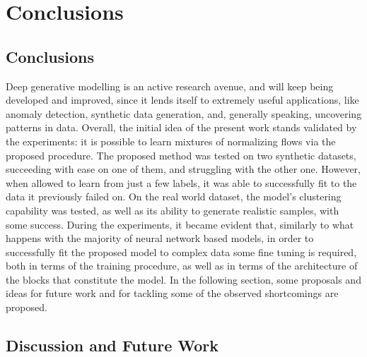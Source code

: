 \chapter{Conclusions}
\label{chapter:conclusions}

\section{Conclusions}
\label{section:conclusions}
Deep generative modelling is an active research avenue, and will keep being
developed and improved, since it lends itself to extremely useful applications,
like anomaly detection, synthetic data generation, and, generally speaking,
uncovering patterns in data.
Overall, the initial idea of the present work stands validated by the experiments:
it is possible to learn mixtures of normalizing flows via the proposed procedure.
The proposed method was tested on two synthetic datasets, succeeding with ease
on one of them, and struggling with the other one. However, when allowed to learn
from just a few labels, it was able to successfully fit to the data it previously
failed on. On the real world dataset, the model's clustering capability was tested,
as well as its ability to generate realistic samples, with some success.
During the experiments, it became evident that, similarly to what happens with
the majority of neural network based models, in order to successfully fit the
proposed model to complex data some fine tuning is required, both in terms of the
training procedure, as well as in terms of the architecture of the blocks that
constitute the model. In the following section, some proposals and ideas for
future work and for tackling some of the observed shortcomings are proposed.

\section{Discussion and Future Work}
\label{section:future}

